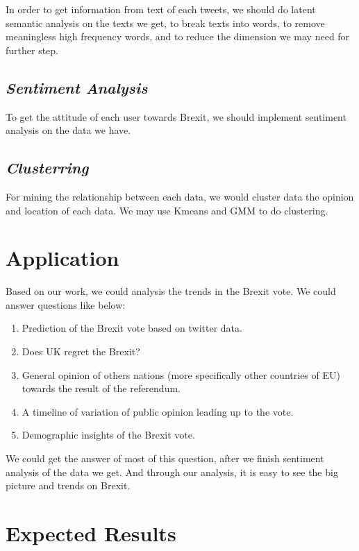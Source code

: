\documentclass{article}
\begin{document}
\par In order to get information from text of each tweets, we should do latent semantic analysis on the texts we get, to break texts into words, to remove meaningless high frequency words, and to reduce the dimension we may need for further step.

\subsection*{\textit{\textbf{Sentiment Analysis}}}
\par To get the attitude of each user towards Brexit, we should implement sentiment analysis on the data we have. 

\subsection*{\textit{\textbf{Clusterring}}}
\par For mining the relationship between each data, we would cluster data the opinion and location of each data. We may use Kmeans and GMM to do clustering.

\section*{Application}
\par Based on our work, we could analysis the trends in the Brexit vote. We could answer questions like below:
\begin{enumerate}
\item Prediction of the Brexit vote based on twitter data.
\item Does UK regret the Brexit?
\item General opinion of others nations (more specifically other countries of EU) towards the result of the referendum.
\item A timeline of variation of public opinion leading up to the vote.
\item Demographic insights of the Brexit vote.
\end{enumerate}

We could get the answer of most of this question, after we finish sentiment analysis of the data we get. And through our analysis, it is easy to see the big picture and trends on Brexit.

\section*{Expected Results}
\end{document}
